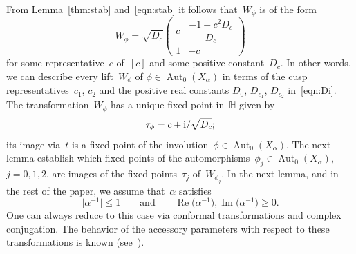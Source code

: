 \documentclass[pdftex]{sigma}
\newcommand{\Po}{\mathbb{H}}
\numberwithin{equation}{section}
\begin{document}
From Lemma~\ref{thm:stab} and~\eqref{eqn:stab} it follows that~$W_\phi$ is of the form
\begin{equation*}%
W_\phi = \sqrt{D_c}
\begin{pmatrix}
c & \dfrac{-1-c^2D_c}{D_c} \\
1 & -c
\end{pmatrix}
\end{equation*}
for some representative~$c$ of~$[c]$ and some positive constant~$D_c$.
In other words, we can describe every lift~$W_\phi$ of $\phi\in\operatorname{Aut}_0(X_\alpha)$ in terms of the cusp representatives~$c_1$, $c_2$ and the positive real constants $D_0$, $D_{c_1}$, $D_{c_2}$ in~\eqref{eqn:Di}.
The transformation~$W_\phi$ has a unique fixed point in~$\Po$ given by
\begin{equation}\label{eqn:fph}
\tau_\phi=c+{\rm i}/\sqrt{D_c} ;
\end{equation}
its image via~$t$ is a fixed point of the involution~$\phi\in\operatorname{Aut}_0(X_\alpha)$. The next lemma establish which fixed points of the automorphisms~$\phi_j\in\operatorname{Aut}_0(X_\alpha)$, $j=0,1,2$, are images of the fixed points~$\tau_j$ of~$W_{\phi_j}$.
In the next lemma, and in the rest of the paper, we assume that~$\alpha$ satisfies
\begin{equation}\label{eqn:norma}
\bigr|\alpha^{-1}\bigl|\le 1\qquad\text{and}\qquad\operatorname{Re}\bigl(\alpha^{-1}\bigr),\operatorname{Im}\bigl(\alpha^{-1}\bigr)\ge0 .
\end{equation}
One can always reduce to this case via conformal transformations and complex conjugation. The behavior of the accessory parameters with respect to these transformations is known (see~\cite{Hempel}).
\end{document}

